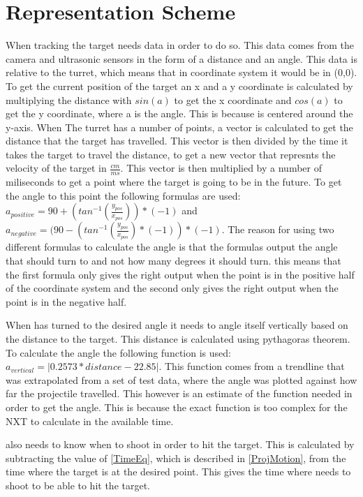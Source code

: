 \chapter{Representation Scheme}
When tracking the target \name needs data in order to do so. This data comes
from the camera and ultrasonic sensors in the form of a distance and an angle.
This data is relative to the turret, which means that in coordinate system it
would be in (0,0). To get the current position of the target an x and a y
coordinate is calculated by multiplying the distance with $sin(a)$ to get the x coordinate and
$cos(a)$ to get the y coordinate, where a is the angle. This is because \name is
centered around the y-axis. When The turret has a number of points, a vector is
calculated to get the distance that the target has travelled. This vector is
then divided by the time it takes the target to travel the distance, to get a new vector that represnts the
velocity of the target in $\frac{cm}{ms}$. This vector is then multiplied by a
number of miliseconds to get a point where the target is going to be in the
future. To get the angle to this point the following formulas are used:
$a_{positive}=90+(tan^{-1}(\frac{y_{pos}}{x_{pos}}))*(-1)$ and
$a_{negative}=(90-(tan^{-1}(\frac{y_{pos}}{x_{pos}})*(-1))*(-1)$. The reason for
using two different formulas to calculate the angle is that the formulas output
the angle that \name should turn to and not how many degrees it should turn.
this means that the first formula only gives the right output when the point is
in the positive half of the coordinate system and the second only gives the
right output when the point is in the negative half.\nl

When \name has turned to the desired angle it needs to angle itself vertically
based on the distance to the target. This distance is calculated using
pythagoras theorem. To calculate the angle the following function is used:\\
$a_{vertical}=| 0.2573*distance-22.85 |$.
This function comes from a trendline that was extrapolated from a set of test
data, where the angle was plotted against how far the projectile travelled. This
however is an estimate of the function needed in order to get the
angle. This is because the exact function is too complex for the NXT to
calculate in the available time.\nl
 
\name also needs to know when to shoot in order to hit the target.
This is calculated by subtracting the value of \autoref{TimeEq}, which is described in
\autoref{ProjMotion}, from the time where the target is at the desired point.
This gives the time where \name needs to shoot to be able to hit the target.
